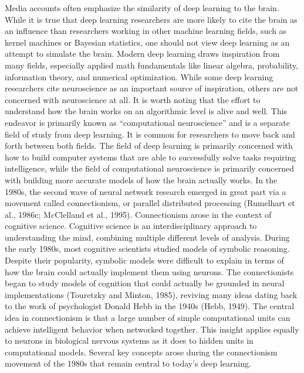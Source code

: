 \documentclass[11pt]{article}
\begin{document}
Media accounts often emphasize the similarity of deep learning to the brain.
While it is true that deep learning researchers are more likely to cite the brain as an influence than researchers working in other machine learning fields, such as kernel machines or Bayesian statistics, one should not view deep learning as an attempt to simulate the brain.
Modern deep learning draws inspiration from many fields, especially applied math fundamentals like linear algebra, probability, information theory, and numerical optimization.
While some deep learning researchers cite neuroscience as an important source of inspiration, others are not concerned with neuroscience at all.
It is worth noting that the effort to understand how the brain works on an algorithmic level is alive and well.
This endeavor is primarily known as “computational neuroscience” and is a separate ﬁeld of study from deep learning.
It is common for researchers to move back and forth between both fields.
The field of deep learning is primarily concerned with how to build computer systems that are able to successfully solve tasks requiring intelligence, while the field of computational neuroscience is primarily concerned with building more accurate models of how the brain actually works.
In the 1980s, the second wave of neural network research emerged in great part via a movement called connectionism, or parallel distributed processing (Rumelhart et al., 1986c; McClelland et al., 1995).
Connectionism arose in the context of cognitive science.
Cognitive science is an interdisciplinary approach to understanding the mind, combining multiple diﬀerent levels of analysis.
During the early 1980s, most cognitive scientists studied models of symbolic reasoning.
Despite their popularity, symbolic models were diﬃcult to explain in terms of how the brain could actually implement them using neurons.
The connectionists began to study models of cognition that could actually be grounded in neural implementations (Touretzky and Minton, 1985), reviving many ideas dating back to the work of psychologist Donald Hebb in the 1940s (Hebb, 1949).
The central idea in connectionism is that a large number of simple computational units can achieve intelligent behavior when networked together.
This insight applies equally to neurons in biological nervous systems as it does to hidden units in computational models.
Several key concepts arose during the connectionism movement of the 1980s that remain central to today’s deep learning.
\end{document}
